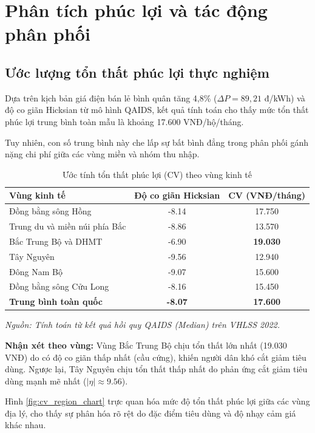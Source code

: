 \documentclass[12pt,a4paper,oneside]{article}
\begin{document}
\section{Phân tích phúc lợi và tác động phân phối}
\label{sec:welfare}

\subsection{Ước lượng tổn thất phúc lợi thực nghiệm}

Dựa trên kịch bản giá điện bán lẻ bình quân tăng 4,8\% ($\Delta P = 89,21$ đ/kWh) và độ co giãn Hicksian từ mô hình QAIDS, kết quả tính toán cho thấy mức tổn thất phúc lợi trung bình toàn mẫu là khoảng 17.600 VNĐ/hộ/tháng.

Tuy nhiên, con số trung bình này che lấp sự bất bình đẳng trong phân phối gánh nặng chi phí giữa các vùng miền và nhóm thu nhập.

\begin{table}[H]
	\centering
	\caption{Ước tính tổn thất phúc lợi (CV) theo vùng kinh tế}
	\label{tab:cv_region}
	\begin{tabular}{l S[table-format=-1.2] S[table-format=2.3]}
		\toprule
		\textbf{Vùng kinh tế} & {\textbf{Độ co giãn Hicksian}} & {\textbf{CV (VNĐ/tháng)}} \\
		\midrule
		Đồng bằng sông Hồng & -8.14 & 17.750 \\
		Trung du và miền núi phía Bắc & -8.86 & 13.570 \\
		Bắc Trung Bộ và DHMT & -6.90 & \textbf{19.030} \\ %
		Tây Nguyên & -9.56 & 12.940 \\ %
		Đông Nam Bộ & -9.07 & 15.600 \\
		Đồng bằng sông Cửu Long & -8.16 & 15.450 \\
		\midrule
		\textbf{Trung bình toàn quốc} & \textbf{-8.07} & \textbf{17.600} \\
		\bottomrule
	\end{tabular}
	\footnotesize{\textit{Nguồn: Tính toán từ kết quả hồi quy QAIDS (Median) trên VHLSS 2022.}}
\end{table}

\textbf{Nhận xét theo vùng:} Vùng Bắc Trung Bộ chịu tổn thất lớn nhất (19.030 VNĐ) do có độ co giãn thấp nhất (cầu cứng), khiến người dân khó cắt giảm tiêu dùng. Ngược lại, Tây Nguyên chịu tổn thất thấp nhất do phản ứng cắt giảm tiêu dùng mạnh mẽ nhất ($|\eta| \approx 9.56$).

Hình \ref{fig:cv_region_chart} trực quan hóa mức độ tổn thất phúc lợi giữa các vùng địa lý, cho thấy sự phân hóa rõ rệt do đặc điểm tiêu dùng và độ nhạy cảm giá khác nhau.
\end{document}
